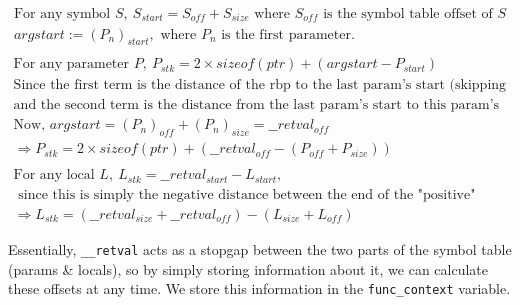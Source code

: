 \documentclass{article}
\begin{document}
{{		\begin{align*}
			\text{For any symbol } S,\ S_{start} = S_{off} + S_{size}\text{ where } S_{off} \text{ is the symbol table offset of } S\\
			argstart := (P_n)_{start}, \text{ where } P_n \text{ is the first parameter.}\\
		\end{align*}
		\vspace*{-32px}
		\begin{align*}
			\text{For any parameter } P,\ P_{stk} = 2 \times sizeof(ptr) + (argstart - P_{start})\\
			\text{Since the first term is the distance of the rbp to the last param's start (skipping rbp, rip)}\\ 
			\text{and the second term is the distance from the last param's start to this param's start}\\
			\text{Now, } argstart = (P_n)_{off} + (P_n)_{size} = \_\_retval_{off}\\
			\Rightarrow P_{stk} = 2\times sizeof(ptr) + (\_\_retval_{off} - (P_{off} + P_{size}))\\
			\\
			\text{For any local } L,\ L_{stk} = \_\_retval_{start} - L_{start},\\
			\text{ since this is simply the negative distance between the end of the "positive" stack and this symbol }\\
			\Rightarrow L_{stk} = (\_\_retval_{size} + \_\_retval_{off}) - (L_{size} + L_{off})
		\end{align*}

		Essentially, \verb|__retval| acts as a stopgap between the two parts of the symbol table (params \& locals), so by simply storing information about it, we can calculate these offsets at any time. We store this information in the \verb|func_context| variable.\bigskip

}}
\end{document}
